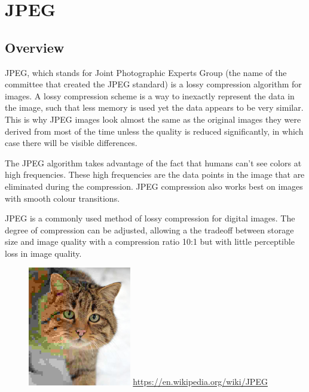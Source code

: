\chapter{JPEG}

\section{Overview}

JPEG, which stands for Joint Photographic Experts Group (the name of the committee that created the JPEG standard) is a lossy compression algorithm for images. A lossy compression scheme is a way to inexactly represent the data in the image, such that less memory is used yet the data appears to be very similar. This is why JPEG images look almost the same as the original images they were derived from most of the time unless the quality is reduced significantly, in which case there will be visible differences.

The JPEG algorithm takes advantage of the fact that humans can't see colors at high frequencies. These high frequencies are the data points in the image that are eliminated during the compression. JPEG compression also works best on images with smooth colour transitions.

JPEG is a commonly used method of lossy compression for digital
images. The degree of compression can be adjusted, allowing a
the tradeoff between storage size and image quality with a
compression ratio 10:1 but with little perceptible loss in image
quality.

\begin{figure}[!ht]
    \centering
    \includegraphics[width=0.40\textwidth]{fig/3-1.png}
    {\url{https://en.wikipedia.org/wiki/JPEG}}
    \label{fig:jpegCompression}
\end{figure}


